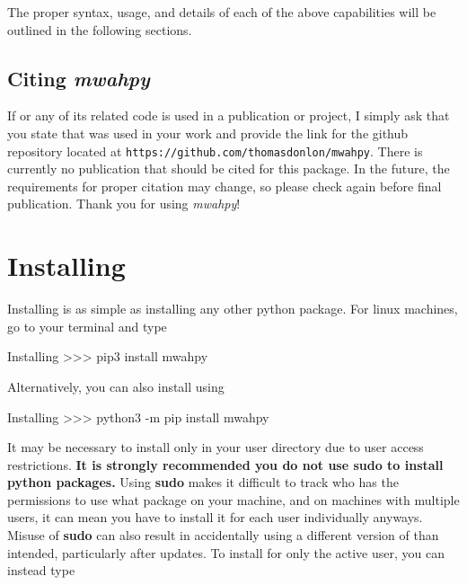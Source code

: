 \documentclass{article}
\begin{document}
The proper syntax, usage, and details of each of the above capabilities will be outlined in the following sections. 

\subsection{Citing \textit{mwahpy}}

If \mwahpy or any of its related code is used in a publication or project, I simply ask that you state that \mwahpy was used in your work and provide the link for the \mwahpy github repository located at \verb!https://github.com/thomasdonlon/mwahpy!. There is currently no publication that should be cited for this package. In the future, the requirements for proper citation may change, so please check again before final publication. Thank you for using \textit{mwahpy}!

\newpage

\section{Installing \mwahpy}

Installing \mwahpy is as simple as installing any other python package. For linux machines, go to your terminal and type \\

\begin{codelisting}{Installing \mwahpy}
>>> pip3 install mwahpy
\end{codelisting}

Alternatively, you can also install \mwahpy using \\

\begin{codelisting}{Installing \mwahpy}
>>> python3 -m pip install mwahpy
\end{codelisting}

It may be necessary to install \mwahpy only in your user directory due to user access restrictions. \textbf{It is strongly recommended you do not use sudo to install python packages.} Using \textbf{sudo} makes it difficult to track who has the permissions to use what package on your machine, and on machines with multiple users, it can mean you have to install it for each user individually anyways. Misuse of \textbf{sudo} can also result in accidentally using a different version of \mwahpy than intended, particularly after updates. To install \mwahpy for only the active user, you can instead type \\ 
\end{document}
